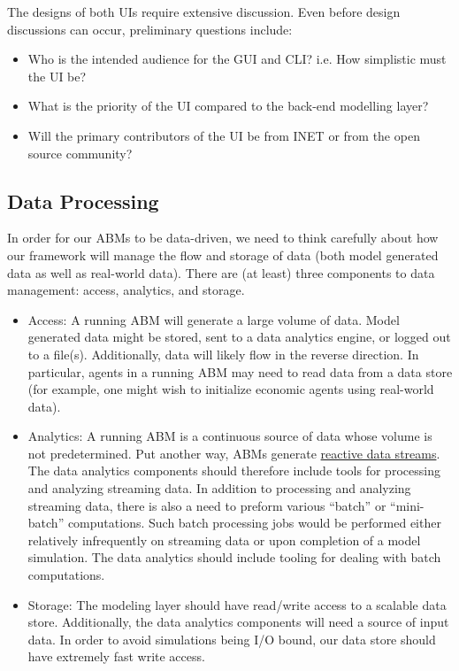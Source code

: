 \documentclass[a4paper]{article}
\begin{document}
The designs of both UIs require extensive discussion. Even before design discussions can occur, preliminary questions include: 

\begin{itemize}
     \item Who is the intended audience for the GUI and CLI? i.e. How simplistic must the UI be?
     \item What is the priority of the UI compared to the back-end modelling layer?
     \item Will the primary contributors of the UI be from INET or from the open source community?  
    \end{itemize}
  
  
\subsection{Data Processing}
\label{refDataAnalytics}

In order for our ABMs to be data-driven, we need to think carefully about how our framework will manage the flow and storage of data (both model generated data as well as real-world data). There are (at least) three components to data management: access, analytics, and storage.
\begin{itemize}
    \item Access: A running ABM will generate a large volume of data. Model generated data might be stored, sent to a data analytics engine, or logged out to a file(s). Additionally, data will likely flow in the reverse direction.  In particular, agents in a running ABM may need to read data from a data store (for example, one might wish to initialize economic agents using real-world data).
    \item Analytics: A running ABM is a continuous source of data whose volume is not predetermined. Put another way, ABMs generate \href{http://www.reactive-streams.org/}{reactive data streams}.  The data analytics components should therefore include tools for processing and analyzing streaming data. In addition to processing and analyzing streaming data, there is also a need to preform various ``batch'' or ``mini-batch'' computations. Such batch processing jobs would be performed either relatively infrequently on streaming data or upon completion of a model simulation. The data analytics should include tooling for dealing with batch computations.
    \item Storage: The modeling layer should have read/write access to a scalable data store. Additionally, the data analytics components will need a source of input data. In order to avoid simulations being I/O bound, our data store should have extremely fast write access.
\end{itemize}
\end{document}
